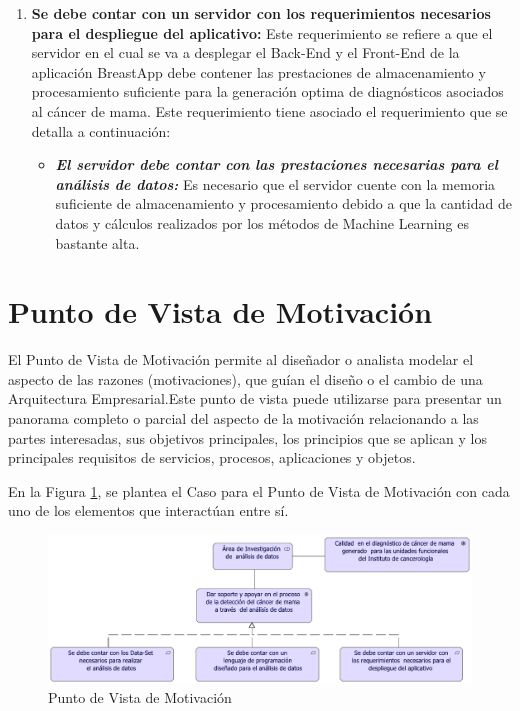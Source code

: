 \begin{enumerate}[label=\textbf{\arabic*})]
	\item  \textbf{Se debe contar con un servidor con los requerimientos necesarios para el despliegue del aplicativo:} Este requerimiento se refiere a que el servidor en el cual se va a desplegar el Back-End y el Front-End de la aplicación BreastApp debe contener las prestaciones de almacenamiento y procesamiento suficiente para la generación  optima de diagnósticos asociados al cáncer de mama. Este requerimiento tiene asociado el requerimiento que se detalla a continuación:
	
	\begin{itemize}
		\item  \textbf{\textit{El servidor debe contar con las	prestaciones necesarias para el análisis de datos:}} Es necesario que el servidor cuente con la memoria suficiente de almacenamiento y procesamiento  debido a que la cantidad de datos y cálculos realizados por los métodos de Machine Learning es bastante alta.
	\end{itemize}
	
\end{enumerate}

\newpage
\section{Punto de Vista de Motivación }

El Punto de Vista de Motivación permite al diseñador o analista modelar el aspecto de las razones (motivaciones), que guían el diseño o el cambio de una Arquitectura Empresarial.Este punto de vista puede utilizarse para presentar un panorama completo o parcial del aspecto de la motivación relacionando a las
partes interesadas, sus objetivos principales, los principios que se aplican y los principales requisitos de servicios, procesos, aplicaciones y objetos\cite{BolanosCastro2019}. 

En la Figura \ref{PvMotivacion}, se plantea el Caso para el Punto de Vista de Motivación con cada uno de los elementos que interactúan entre sí. 

\begin{figure}[h!]
	\centering
	\includegraphics[width=1\linewidth]{ARQUITECTURA/imgs/CapaMotivacion/6_PvMotivacion}
	\caption{Punto de Vista de Motivación}
	\label{PvMotivacion}
\end{figure}

